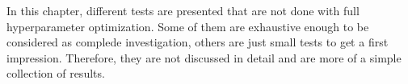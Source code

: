 In this chapter, different tests are presented that are not done with full hyperparameter optimization.
Some of them are exhaustive enough to be considered as complede investigation, others are just small tests to get a first impression.
Therefore, they are not discussed in detail and are more of a simple collection of results.


\newpage
